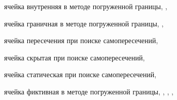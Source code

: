 ячейка внутренняя в методе погруженной границы, \pageref{term:cell_ibm_innner}, \pageref{term:cell_ibm_innner2}

ячейка граничная в методе погруженной границы, \pageref{term:cell_ibm_border}, \pageref{term:cell_ibm_border2}

ячейка пересечения при поиске самопересечений, \pageref{term:cell_intersect}

ячейка скрытая при поиске самопересечений, \pageref{term:cell_hidden}

ячейка статическая при поиске самопересечений, \pageref{term:cell_static}

ячейка фиктивная в методе погруженной границы, \pageref{term:cell_ibm_ghost}, \pageref{term:cell_ibm_ghost2}, \pageref{term:cell_ibm_ghost3}, \pageref{term:cell_ibm_ghost4}
